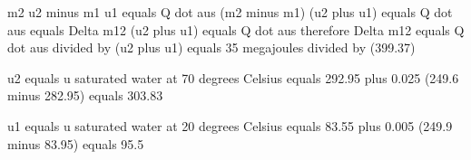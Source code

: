 m2 u2 minus m1 u1 equals Q dot aus  
(m2 minus m1) (u2 plus u1) equals Q dot aus  
equals Delta m12 (u2 plus u1) equals Q dot aus  
therefore Delta m12 equals Q dot aus divided by (u2 plus u1) equals 35 megajoules divided by (399.37)

u2 equals u saturated water at 70 degrees Celsius  
equals 292.95 plus 0.025 (249.6 minus 282.95)  
equals 303.83  

u1 equals u saturated water at 20 degrees Celsius  
equals 83.55 plus 0.005 (249.9 minus 83.95)  
equals 95.5